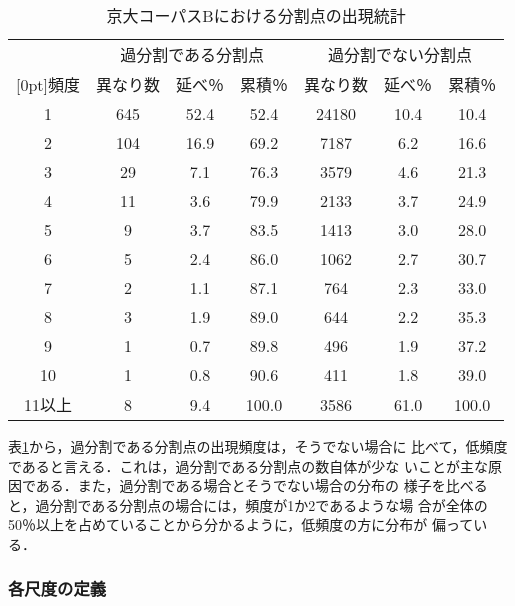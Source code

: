 \begin{table}[htbp]
  \begin{center}
    \caption{京大コーパスBにおける分割点の出現統計}
    
    \begin{tabular}{|c||ccc|ccc|}
      \hline
      & \multicolumn{3}{c|}{過分割である分割点}
      & \multicolumn{3}{c|}{過分割でない分割点}\\
      \cline{2-7}
      \raisebox{1.5ex}[0pt]{頻度} & 異なり数 & 延べ％ & 累積％ & 異なり数 & 延べ％ & 累積％ \\
      \hline
      1 & 645 &52.4 &52.4  &24180 &10.4 & 10.4\\
      2 & 104 &16.9 &69.2  &7187  &6.2  & 16.6\\
      3 & 29  &7.1  &76.3  &3579  &4.6  & 21.3\\
      4 & 11  &3.6  &79.9  &2133  &3.7  & 24.9\\
      5 & 9   &3.7  &83.5  &1413  &3.0  & 28.0\\
      6 & 5   &2.4  &86.0  &1062  &2.7  & 30.7\\
      7 & 2   &1.1  &87.1  &764   &2.3  & 33.0\\
      8 & 3   &1.9  &89.0  &644   &2.2  & 35.3\\
      9 & 1   &0.7  &89.8  &496   &1.9  & 37.2\\
      10& 1   &0.8  &90.6  &411   &1.8  & 39.0\\
      \hline
  11以上& 8   &9.4  &100.0 &3586  &61.0 & 100.0 \\
      \hline
    \end{tabular}
    \label{tab:freq}
  \end{center}
\end{table}

表\ref{tab:freq}から，過分割である分割点の出現頻度は，そうでない場合に
比べて，低頻度であると言える．これは，過分割である分割点の数自体が少な
いことが主な原因である．また，過分割である場合とそうでない場合の分布の
様子を比べると，過分割である分割点の場合には，頻度が1か2であるような場
合が全体の50％以上を占めていることから分かるように，低頻度の方に分布が
偏っている．

\subsubsection*{各尺度の定義}

